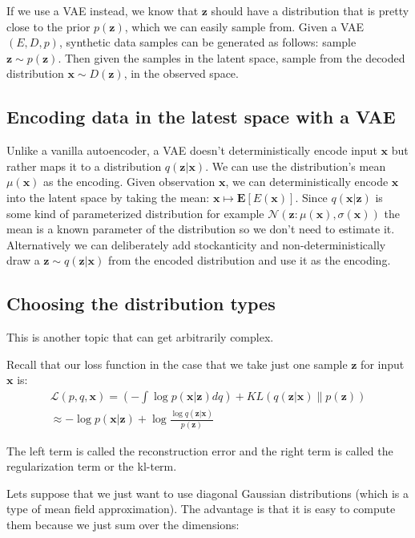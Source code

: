 \documentclass[11pt, a4paper]{report}
\theoremstyle{plain}
\theoremstyle{definition}
\theoremstyle{remark}
\newcommand{\E}{\mathbf{E}}
\newcommand{\x}{\mathbf{x}}
\newcommand{\z}{\mathbf{z}}
\newcommand{\LL}{\mathcal{L}}
\newcommand{\NN}{\mathcal{N}}
\begin{document}
If we use a VAE instead, we know that $\z$ should have a distribution that is pretty
close to the prior $p(\z)$, which we can easily sample from.
Given a VAE $(E, D, p)$, synthetic data samples can be generated as follows:
sample $\z \sim p(\z)$. Then given the samples in the latent space, sample
from the decoded distribution $\x \sim D(\z)$, in the observed space.

\subsection{Encoding data in the latest space with a VAE}

Unlike a vanilla autoencoder, a VAE doesn't deterministically encode input $\x$
but rather maps it to a distribution $q(\z | \x)$.
We can use the distribution's mean $\mu(\x)$ as the
encoding. 
Given observation $\x$, we can deterministically encode $\x$ into 
the latent space by taking the mean: $\x \mapsto \E [E(\x)]$. 
Since $q(\x | \z)$ is some kind of parameterized distribution for example 
$\NN(\z: \mu(\x), \sigma(\x))$  
the mean is a known parameter of the distribution so we don't need to estimate
it.
Alternatively we can deliberately add stockanticity and 
non-deterministically draw a $\z \sim q(\z | \x)$ from the encoded distribution
and use it as the encoding.

\subsection{Choosing the distribution types}
This is another topic that can get arbitrarily complex.

Recall that our loss function in the case that we take just one sample $\z$ for input $\x$
is:
\begin{equation}
\label{eq:vanillavaeloss}
\begin{aligned}
\LL(p,q,\x) 
= (-\int \log p (\x | \z)dq) + KL(q(\z | \x) \| p(\z)) \\
\approx -\log p (\x | \z) + \log \frac{\log q(\z | \x)}{p(\z)}
\end{aligned}
\end{equation}

The left term is called the reconstruction error and the 
right term is called the regularization term or the kl-term.


Lets suppose that we just want to use diagonal Gaussian distributions (which is
a type of mean field approximation).
The advantage is that it is easy to compute them because we just sum over the
dimensions:
\end{document}
